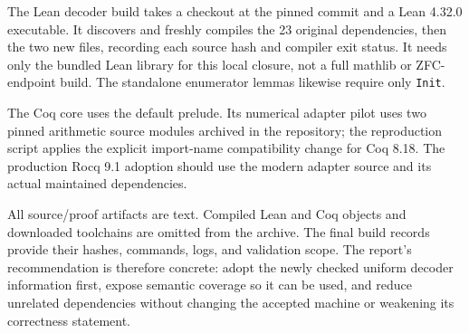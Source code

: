 \documentclass[11pt,letterpaper]{article}
\newcommand{\code}[1]{\texttt{\small #1}}
\begin{document}
The Lean decoder build takes a checkout at the pinned commit and a Lean 4.32.0
executable. It discovers and freshly compiles the 23 original dependencies, then the
two new files, recording each source hash and compiler exit status. It needs only the
bundled Lean library for this local closure, not a full mathlib or ZFC-endpoint build.
The standalone enumerator lemmas likewise require only \code{Init}.

The Coq core uses the default prelude. Its numerical adapter pilot uses two pinned
arithmetic source modules archived in the repository; the reproduction script applies
the explicit import-name compatibility change for Coq 8.18. The production Rocq 9.1
adoption should use the modern adapter source and its actual maintained dependencies.

All source/proof artifacts are text. Compiled Lean and Coq objects and downloaded
toolchains are omitted from the archive. The final build records provide their hashes,
commands, logs, and validation scope. The report's recommendation is therefore concrete:
adopt the newly checked uniform decoder information first, expose semantic coverage
so it can be used, and reduce unrelated dependencies without changing the accepted
machine or weakening its correctness statement.
\end{document}
